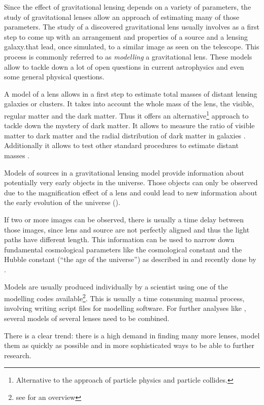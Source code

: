 \documentclass[11pt]{article}
\begin{document}
Since the effect of gravitational lensing depends on a variety of parameters, the study of gravitational lenses allow an approach of estimating many of those parameters.
The study of a discovered gravitational lens usually involves as a first step to come up with an arrangement and properties of a source and a lensing galaxy.that lead, once simulated, to a similar image as seen on the telescope.
This process is commonly referred to as \emph{modelling} a gravitational lens.
These models allow to tackle down a lot of open questions in current astrophysics and even some general physical questions.

A model of a lens allows in a first step to estimate total masses of distant lensing galaxies or clusters.
It takes into account the whole mass of the lens, the visible, regular matter and the dark matter\cite{kochanek1995there}.
Thus it offers an alternative\footnote{Alternative to the approach of particle physics and particle collides.} approach to tackle down the mystery of dark matter.
It allows to measure the ratio of visible matter to dark matter and the radial distribution of dark matter in galaxies \cite{treukoop04}.
Additionally it allows to test other standard procedures to estimate distant masses \cite{kochanek1995there}.

Models of sources in a gravitational lensing model provide information about potentially very early objects in the universe.
Those objects can only be observed due to the magnification effect of a lens and could lead to new information about the early evolution of the universe (\cite{rusin03}).

If two or more images can be observed, there is usually a time delay between those images, since lens and source are not perfectly aligned and thus the light paths have different length.
This information can be used to narrow down fundamental cosmological parameters like the cosmological constant and the Hubble constant (``the age of the universe'') as described in \cite{refsdal1964} and recently done by \cite{age_uni}.


Models are usually produced individually by a scientist using one of the modelling codes available\footnote{see \cite{overview_soft2013} for an overview}.
This is usually a time consuming manual process, involving writing script files for modelling software.
For further analyses like \cite{age_uni}, several models of several lenses need to be combined.

There is a clear trend: there is a high demand in finding many more lenses, model them as quickly as possible and in more sophisticated ways to be able to further research.
\end{document}
